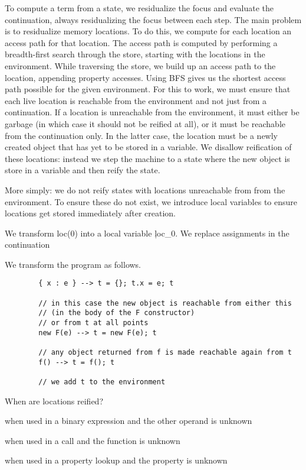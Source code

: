 {To compute a term from a state, we residualize the focus
and evaluate the continuation, always residualizing the focus
between each step.
The main problem is to residualize memory locations.
To do this, we compute for each location an access path for that 
location. The access path is computed by performing a breadth-first search through the store, starting with the locations in the environment.
While traversing the store, we build up an access path to the location, appending property accesses.
Using BFS gives us the shortest access path possible for the given
environment.
For this to work, we must ensure that each live location is reachable 
from the environment and not just from a continuation.
If a location is unreachable from the environment, it must either be garbage (in which case it should not be reified at all), or it must be reachable from
the continuation only.
In the latter case, the location must be a newly created object
that has yet to be stored in a variable.
We disallow reification of these locations: instead we step the
machine to a state where the new object is store in a variable
and then reify the state.

More simply: we do not reify states with locations unreachable from
from the environment. To ensure these do not exist, we introduce
local variables to ensure locations get stored immediately after creation.

We transform loc(0) into a local variable \c{loc_0}.
We replace assignments in the continuation 

We transform the program as follows.

\begin{verbatim}
        { x : e } --> t = {}; t.x = e; t

        // in this case the new object is reachable from either this
        // (in the body of the F constructor)
        // or from t at all points
        new F(e) --> t = new F(e); t

        // any object returned from f is made reachable again from t
        f() --> t = f(); t

        // we add t to the environment
\end{verbatim}

When are locations reified?

        when used in a binary expression and the other operand
        is unknown

        when used in a call and the function is unknown

        when used in a property lookup and the property is unknown

}
